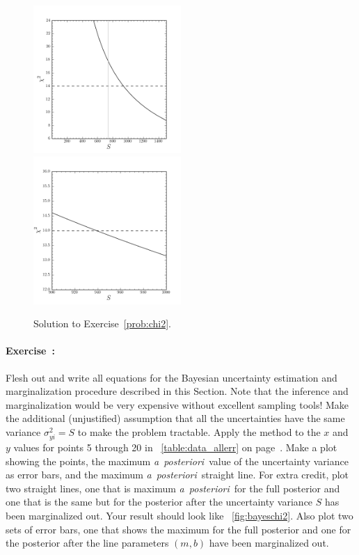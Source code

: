 \documentclass[12pt,twoside]{article}
\newcommand{\notenglish}[1]{\textsl{#1}}
\newcommand{\aposteriori}{\notenglish{a~posteriori}}
\newcommand{\sectionname}{Section}
\newcommand{\problemname}{Exercise}
\newcounter{problem}
\newenvironment{problem}{\paragraph{\problemname~\theproblem:}\refstepcounter{problem}}{}
\begin{document}
\begin{figure}[htbp]
\includegraphics[width=0.5\textwidth]{ex9.png}
\includegraphics[width=0.5\textwidth]{ex9b.png}
\caption{Solution to \problemname~\ref{prob:chi2}.}\label{fig:chi2}
\end{figure}

\begin{problem}\label{prob:bayeschi2}
Flesh out and write all equations for the Bayesian uncertainty
estimation and marginalization procedure described in this
\sectionname.  Note that the inference and marginalization would be
very expensive without excellent sampling tools!  Make the additional
(unjustified) assumption that all the uncertainties have the same
variance $\sigma_{yi}^2=S$ to make the problem tractable.  Apply the
method to the $x$ and $y$ values for points 5 through 20 in
\tablename~\ref{table:data_allerr} on
page~\pageref{table:data_allerr}.  Make a plot showing the points, the
maximum \aposteriori\ value of the uncertainty variance as error bars,
and the maximum \aposteriori\ straight line.  For extra credit, plot
two straight lines, one that is maximum \aposteriori\ for the full
posterior and one that is the same but for the posterior after the
uncertainty variance $S$ has been marginalized out.  Your result
should look like \figurename~\ref{fig:bayeschi2}.  Also plot two
sets of error bars, one that shows the maximum for the full posterior
and one for the posterior after the line parameters $(m,b)$ have been
marginalized out.
\end{problem}
\end{document}

